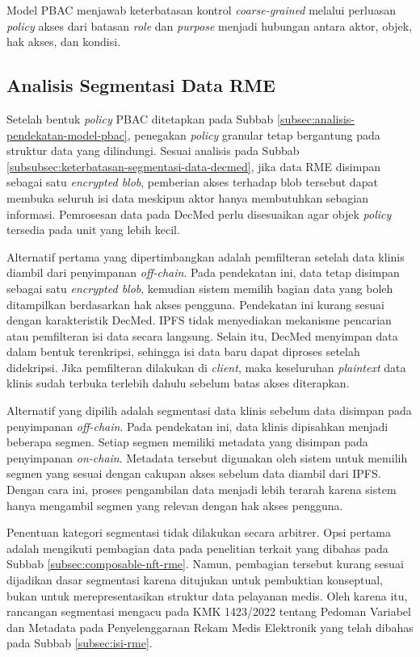 \documentclass[bahasa, 12pt, a4paper, onecolumn, oneside, final]{report}
\begin{document}
Model PBAC menjawab keterbatasan kontrol \textit{coarse-grained} melalui perluasan \textit{policy} akses dari batasan \textit{role} dan \textit{purpose} menjadi hubungan antara aktor, objek, hak akses, dan kondisi.
\subsection{Analisis Segmentasi Data RME}
\label{subsec:analisis-segmentasi-data-rme}

Setelah bentuk \textit{policy} PBAC ditetapkan pada Subbab \ref{subsec:analisis-pendekatan-model-pbac}, penegakan \textit{policy} granular tetap bergantung pada struktur data yang dilindungi. Sesuai analisis pada Subbab \ref{subsubsec:keterbatasan-segmentasi-data-decmed}, jika data RME disimpan sebagai satu \textit{encrypted blob}, pemberian akses terhadap blob tersebut dapat membuka seluruh isi data meskipun aktor hanya membutuhkan sebagian informasi. Pemrosesan data pada DecMed perlu disesuaikan agar objek \textit{policy} tersedia pada unit yang lebih kecil.

Alternatif pertama yang dipertimbangkan adalah pemfilteran setelah data klinis diambil dari penyimpanan \textit{off-chain}. Pada pendekatan ini, data tetap disimpan sebagai satu \textit{encrypted blob}, kemudian sistem memilih bagian data yang boleh ditampilkan berdasarkan hak akses pengguna. Pendekatan ini kurang sesuai dengan karakteristik DecMed. IPFS tidak menyediakan mekanisme pencarian atau pemfilteran isi data secara langsung. Selain itu, DecMed menyimpan data dalam bentuk terenkripsi, sehingga isi data baru dapat diproses setelah didekripsi. Jika pemfilteran dilakukan di \textit{client}, maka keseluruhan \textit{plaintext} data klinis sudah terbuka terlebih dahulu sebelum batas akses diterapkan.

Alternatif yang dipilih adalah segmentasi data klinis sebelum data disimpan pada penyimpanan \textit{off-chain}. Pada pendekatan ini, data klinis dipisahkan menjadi beberapa segmen. Setiap segmen memiliki metadata yang disimpan pada penyimpanan \textit{on-chain}. Metadata tersebut digunakan oleh sistem untuk memilih segmen yang sesuai dengan cakupan akses sebelum data diambil dari IPFS. Dengan cara ini, proses pengambilan data menjadi lebih terarah karena sistem hanya mengambil segmen yang relevan dengan hak akses pengguna.

Penentuan kategori segmentasi tidak dilakukan secara arbitrer. Opsi pertama adalah mengikuti pembagian data pada penelitian terkait yang dibahas pada Subbab \ref{subsec:composable-nft-rme}. Namun, pembagian tersebut kurang sesuai dijadikan dasar segmentasi karena ditujukan untuk pembuktian konseptual, bukan untuk merepresentasikan struktur data pelayanan medis. Oleh karena itu, rancangan segmentasi mengacu pada KMK 1423/2022 tentang Pedoman Variabel dan Metadata pada Penyelenggaraan Rekam Medis Elektronik yang telah dibahas pada Subbab \ref{subsec:isi-rme}.
\end{document}
